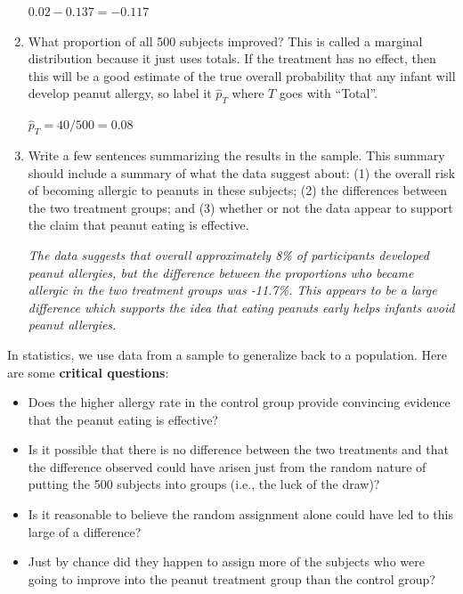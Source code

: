 \begin{enumerate}
\begin{key}
  {\it  $0.02 - 0.137 = -0.117$}
\end{key}

   \item What proportion of all 500 subjects improved?  This is called
     a marginal distribution because it just uses totals.  If the
     treatment has no effect, then this will be a good estimate of the
     true overall probability that any infant will develop peanut
     allergy, so label it $\widehat{p}_T$ where $T$ goes with ``Total''.
\begin{students}
\vspace{2cm}
\end{students}

\begin{key}
  {\it $\widehat{p}_T = 40/500 = 0.08$ }
\end{key}


   \item  Write a few sentences summarizing the results in the
     sample. This summary should include a summary of what the data
     suggest about: (1) the overall risk of becoming allergic to
     peanuts in these  subjects; (2) the differences between the two
     treatment groups; 
     and (3) whether or not the data appear to support the claim that
     peanut eating is effective. 
\begin{students}
\vspace{4cm}
\end{students}

\begin{key}
  {\it       The data suggests that overall approximately 8\% of
     participants developed peanut allergies, but the difference
     between the proportions who became allergic in the two treatment
     groups  was -11.7\%.  This appears to be a large difference which
     supports the idea that eating peanuts early helps infants avoid
     peanut allergies.}
\end{key}

   \end{enumerate}
   
   In statistics, we use data from a sample to generalize back to a
   population.  Here are some {\bf critical questions}:
   \begin{itemize}
   \item Does the higher allergy rate in the control group provide
     convincing evidence that the peanut eating is effective?
   \item Is it possible that there is no difference between the two
     treatments and that the difference observed could have arisen
     just from the random nature of putting the 500 subjects into
     groups (i.e., the luck of the draw)?
   \item Is it reasonable to believe the random assignment alone could
     have led to this large of a difference?
   \item Just by chance did they happen to assign
     more of the subjects who were going to improve into the peanut
     treatment group than the control group?
   \end{itemize}
 
